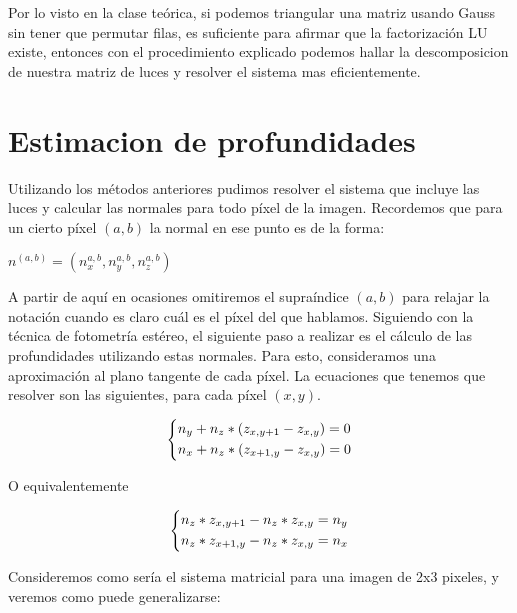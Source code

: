 Por lo visto en la clase teórica, si podemos triangular una matriz usando Gauss sin tener que permutar filas, es suficiente para afirmar que la factorización LU existe, entonces con el procedimiento explicado podemos hallar la descomposicion de nuestra matriz de luces y resolver el sistema mas eficientemente. \\

\section{Estimacion de profundidades}

Utilizando los métodos anteriores pudimos resolver el sistema que incluye las luces y calcular las normales para todo píxel de la imagen. Recordemos que para un cierto píxel $(a, b)$ la normal en ese punto es de la forma:

\begin{center}
$n^{(a,b)} = (n_{x}^{a,b}, n_{y}^{a,b}, n_{z}^{a,b})$
\end{center}

A partir de aquí en ocasiones omitiremos el supraíndice $(a,b)$ para relajar la notación cuando es claro cuál es el píxel del que hablamos. Siguiendo con la técnica de fotometría estéreo, el siguiente paso a realizar es el cálculo de las profundidades utilizando estas normales. Para esto, consideramos una aproximación al plano tangente de cada píxel. La ecuaciones que tenemos que resolver son las siguientes, para cada píxel $(x ,y)$.

\begin{center}
\[
    \begin{dcases}
        n_{y} +  n_{z} * (z_{x, y+1} - z_{x, y}) = 0 \\
        n_{x} +  n_{z} * (z_{x+1, y} - z_{x, y}) = 0
    \end{dcases}
\]
\end{center}
O equivalentemente
\begin{center}
\[\begin{dcases}
        n_{z} * z_{x, y+1} - n_{z} *  z_{x, y} = n_{y}  \\
        n_{z} * z_{x+1, y} - n_{z} *  z_{x, y} = n_{x}
    \end{dcases}
\]
\end{center}

Consideremos como sería el sistema matricial para una imagen de 2x3 pixeles, y veremos como puede generalizarse: \\


